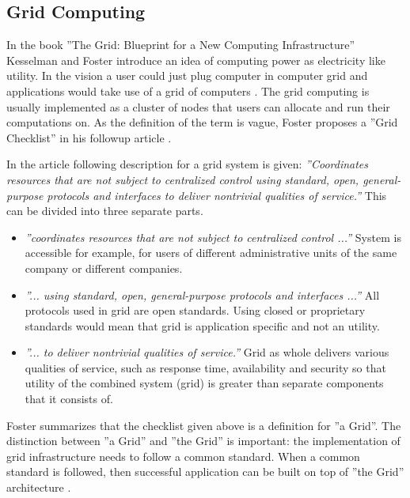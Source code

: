 \documentclass{tktltiki}
\begin{document}
\subsection{Grid Computing}

In the book ''The Grid: Blueprint for a New Computing Infrastructure'' Kesselman and Foster introduce an idea of computing power as electricity like utility.  In the vision a user could just plug computer in computer grid and applications would take use of a grid  of computers \cite{TheGrid08}. The grid computing is usually implemented as a cluster of nodes that users can allocate and run their computations on.   As the definition of the term is vague, Foster proposes a ''Grid Checklist'' in his followup article \cite{WhatIsGrid02}.

In the article following description for a grid system is given: \emph{''Coordinates resources that are not subject to centralized control using standard, open, general-purpose protocols and interfaces to deliver nontrivial qualities of service.''}  This can be divided into three separate parts.

\begin{itemize}
	\item{\emph{''coordinates resources that are not subject to centralized control ...''}
System is accessible for example, for users of different administrative units of the same company or different companies.}
	\item{\emph{''... using standard, open, general-purpose protocols and interfaces ...''}
All protocols used in grid are open standards. Using closed or proprietary standards would mean that grid is application specific and not an utility.
}
	\item{\emph{''... to deliver nontrivial qualities of service.''}
Grid as whole delivers various qualities of service, such as response time, availability and security so that utility of the combined system (grid) is greater than separate components that it consists of.
}

\end{itemize}


Foster summarizes that the checklist given above is a definition for ''a Grid''.  The distinction between ''a Grid'' and ''the Grid'' is important: the implementation of grid infrastructure needs to follow a common standard.  When a common standard is followed, then successful application can be built on top of ''the Grid'' architecture \cite{WhatIsGrid02}.
\end{document}
